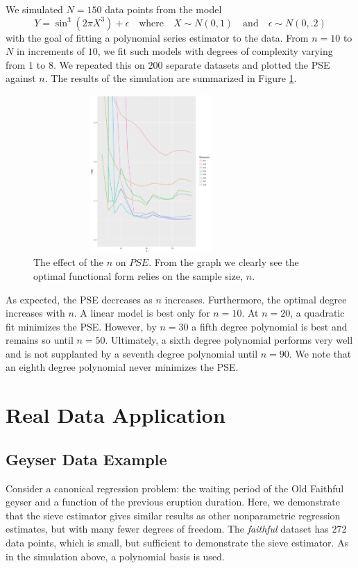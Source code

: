 \documentclass[12pt]{article}  %
\begin{document}
We simulated $N = 150$ data points from the model
$$Y = \sin^3(2\pi X^3) + \epsilon\hspace{1em}\text{where}\hspace{1em}X \sim N(0,1)\hspace{1em}\text{and}\hspace{1em}
\epsilon \sim N(0, .2)$$
with the goal of fitting a polynomial series estimator to the data. From $n = 10$ to $N$ in increments of $10$, we fit such models with degrees of complexity varying from $1$ to $8$. We repeated this on $200$ separate datasets and plotted the PSE against $n$. The results of the simulation are summarized in Figure \ref{fig:sim}. 
\begin{figure}[h]
    \centering
    \includegraphics[width=0.8\textwidth, height= 6cm]{sim_plot.pdf}  
    \caption{The effect of the $n$ on $PSE$. From the graph we clearly see the optimal functional form relies on the sample size, $n$.}
    \label{fig:sim}{}
\end{figure}
 As expected, the PSE decreases as $n$ increases. Furthermore, the optimal degree increases with $n$. A linear model is best only for $n=10$. At $n=20$, a quadratic fit minimizes the PSE. However, by $n=30$ a fifth degree polynomial is best and remains so until $n=50$. Ultimately, a sixth degree polynomial performs very well and is not supplanted by a seventh degree polynomial until $n=90$. We note that an eighth degree polynomial never minimizes the PSE.


\section{Real Data Application}
\subsection{Geyser Data Example}

Consider a canonical regression problem: the waiting period of the Old Faithful geyser and a function  of the previous eruption duration.  Here, we demonstrate that the sieve estimator gives similar results as other nonparametric regression estimates, but with many fewer degrees of freedom. The \textit{faithful} dataset has 272 data points, which is small, but sufficient to demonstrate the sieve estimator. As in the simulation above, a polynomial basis is used.
\end{document}
